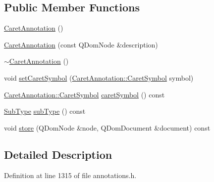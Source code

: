 \subsection*{Public Member Functions}
\begin{DoxyCompactItemize}
\item 
\hyperlink{classOkular_1_1CaretAnnotation_a96fd46a67b080689128acf9aefa4d17f}{Caret\+Annotation} ()
\item 
\hyperlink{classOkular_1_1CaretAnnotation_a55bfb4eebec11782fda2855ae340f4dc}{Caret\+Annotation} (const Q\+Dom\+Node \&description)
\item 
\hyperlink{classOkular_1_1CaretAnnotation_aab7f00e4d6f59f0ce1f75f5e8e9fd313}{$\sim$\+Caret\+Annotation} ()
\item 
void \hyperlink{classOkular_1_1CaretAnnotation_a3f6f7dcb073888075762244d2805981f}{set\+Caret\+Symbol} (\hyperlink{classOkular_1_1CaretAnnotation_a0fa75d6ac84d6e08aae0561b55e98695}{Caret\+Annotation\+::\+Caret\+Symbol} symbol)
\item 
\hyperlink{classOkular_1_1CaretAnnotation_a0fa75d6ac84d6e08aae0561b55e98695}{Caret\+Annotation\+::\+Caret\+Symbol} \hyperlink{classOkular_1_1CaretAnnotation_ac328095a16f32e9039d917d7ee2774dc}{caret\+Symbol} () const 
\item 
\hyperlink{classOkular_1_1Annotation_af71b46e37d5f850b97d5c4de3be9aac0}{Sub\+Type} \hyperlink{classOkular_1_1CaretAnnotation_aa126043fc2afcb4b89bd197dbdb463a0}{sub\+Type} () const 
\item 
void \hyperlink{classOkular_1_1CaretAnnotation_ac1d1d750933fa58b3868cec6fe645dfd}{store} (Q\+Dom\+Node \&node, Q\+Dom\+Document \&document) const 
\end{DoxyCompactItemize}


\subsection{Detailed Description}


Definition at line 1315 of file annotations.\+h.



